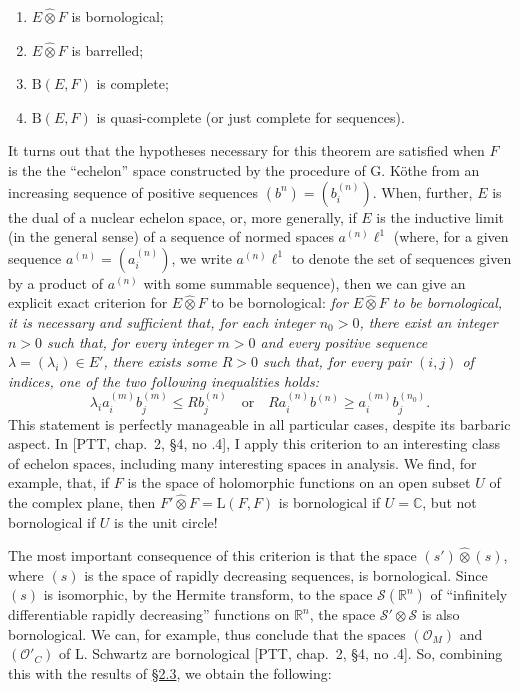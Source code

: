 \documentclass[british]{article}
\providecommand{\tightlist}{%
\setlength{\itemsep}{0pt}\setlength{\parskip}{0pt}}
\newcommand{\oldpage}[1]{\marginpar{\footnotesize$\Big\vert$ \textit{p.~#1}}}
\begin{document}
\begin{enumerate}
\def\labelenumi{\alph{enumi}.}
\tightlist
\item
  \(E\hat{\otimes}F\) is bornological;
\item
  \(E\hat{\otimes}F\) is barrelled;
\item
  \(\mathrm{B}(E,F)\) is complete;
\item
  \(\mathrm{B}(E,F)\) is quasi-complete (or just complete for
  sequences).
\end{enumerate}

It turns out that the hypotheses necessary for this theorem are
satisfied when \(F\) is the the ``echelon'' space constructed by the
procedure of G. Köthe \autocite{7} from an increasing sequence of
positive sequences \((b^n)=(b_i^{(n)})\). When, further, \(E\) is the
dual of a nuclear echelon space, or, more generally, if \(E\) is the
inductive limit (in the general sense) of a sequence of normed spaces
\(a^{(n)}\ell^1\) (where, for a given sequence \(a^{(n)}=(a_i^{(n)})\),
we write \(a^{(n)}\ell^1\) to denote the set of sequences given by a
product of \(a^{(n)}\) with some summable sequence), then we can give an
explicit exact criterion for \(E\hat{\otimes}F\) to be bornological:
\emph{for \(E\hat{\otimes}F\) to be bornological, it is necessary and
sufficient that, for each integer \(n_0>0\), there exist an integer
\(n>0\) such that, for every integer \(m>0\) and every positive sequence
\(\lambda=(\lambda_i)\in E'\), there exists some \(R>0\) such that, for
every pair \((i,j)\) of indices, one of the two following inequalities
holds:} \[
  \lambda_i a_i^{(m)}b_j^{(m)} \leqslant Rb_j^{(n)}
  \quad\text{or}\quad
  Ra_i^{(n)}b^{(n)} \geqslant a_i^{(m)}b_j^{(n_0)}.
\] This statement is perfectly manageable in all particular cases,
despite its barbaric aspect. In {[}PTT, chap.~2, §4, no .4{]}, I apply
this criterion to an interesting class of echelon spaces, including many
interesting spaces in analysis. We find, for example, that, if \(F\) is
the space of holomorphic functions on an open subset \(U\) of the
complex plane, then \(F'\hat{\otimes}F=\mathrm{L}(F,F)\) is bornological
if \(U=\mathbb{C}\), but not bornological if \(U\) is the unit circle!

The most important consequence of this criterion is that the space
\((s')\hat{\otimes}(s)\), where \((s)\) is the space of rapidly
decreasing sequences, is bornological. \oldpage{112} Since \((s)\) is
isomorphic, by the Hermite transform, to the space
\(\mathscr{S}(\mathbb{R}^n)\) of ``infinitely differentiable rapidly
decreasing'' functions on \(\mathbb{R}^n\), the space
\(\mathscr{S}'\otimes\mathscr{S}\) is also bornological. We can, for
example, thus conclude that the spaces \((\mathscr{O}_M)\) and
\((\mathscr{O}'_C)\) of L. Schwartz are bornological {[}PTT, chap.~2,
§4, no .4{]}. So, combining this with the results of
\hyperref[section-2.3]{§2.3}, we obtain the following:
\end{document}
